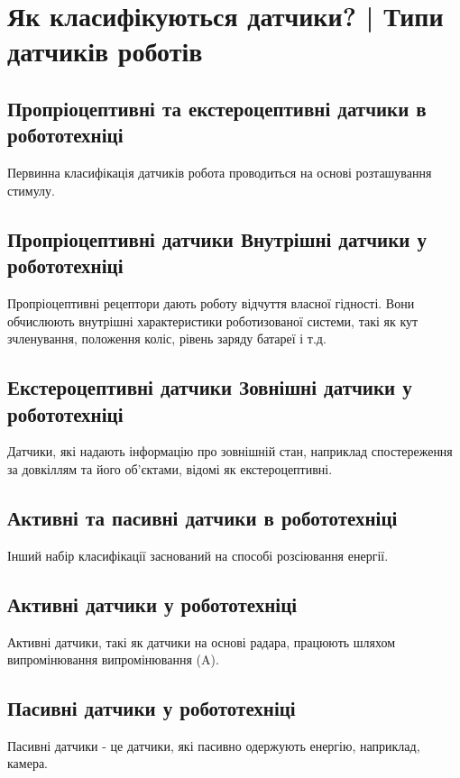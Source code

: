 \documentclass[a4paper,14pt]{extreport}
\begin{document}
\section{Як класифікуються датчики? | Типи датчиків роботів}\par

\subsection{Пропріоцептивні та екстероцептивні датчики в робототехніці}
Первинна класифікація датчиків робота проводиться на основі розташування стимулу.

\subsection{Пропріоцептивні датчики Внутрішні датчики у робототехніці}
Пропріоцептивні  рецептори дають роботу відчуття власної гідності. Вони обчислюють внутрішні характеристики роботизованої системи, такі як кут зчленування, положення коліс, рівень заряду батареї і т.д.

\subsection{Екстероцептивні датчики Зовнішні датчики у робототехніці}
Датчики, які надають інформацію про зовнішній стан, наприклад спостереження за довкіллям та його об'єктами, відомі як екстероцептивні.

\subsection{Активні та пасивні датчики в робототехніці}
Інший набір класифікації заснований на способі розсіювання енергії.

\subsection{Активні датчики у робототехніці}
Активні датчики, такі як датчики на основі радара, працюють шляхом випромінювання випромінювання (A).

\subsection{Пасивні датчики у робототехніці}
Пасивні датчики - це датчики, які пасивно одержують енергію, наприклад, камера.

 
\end{document}
